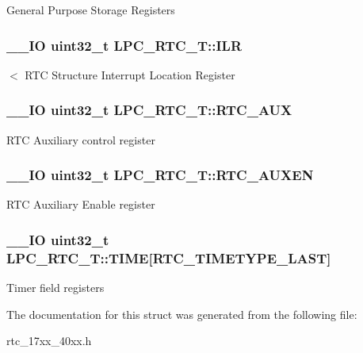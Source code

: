 General Purpose Storage Registers \hypertarget{struct_l_p_c___r_t_c___t_a6e1debaa7074a0fae4767a70f9abff29}{
\subsubsection[{I\+L\+R}]{\setlength{\rightskip}{0pt plus 5cm}\+\_\+\+\_\+\+I\+O uint32\+\_\+t L\+P\+C\+\_\+\+R\+T\+C\+\_\+\+T\+::\+I\+L\+R}}\label{struct_l_p_c___r_t_c___t_a6e1debaa7074a0fae4767a70f9abff29}
$<$ R\+T\+C Structure Interrupt Location Register \hypertarget{struct_l_p_c___r_t_c___t_ab476d508c9ea87e71724c30d36ece294}{
\subsubsection[{R\+T\+C\+\_\+\+A\+U\+X}]{\setlength{\rightskip}{0pt plus 5cm}\+\_\+\+\_\+\+I\+O uint32\+\_\+t L\+P\+C\+\_\+\+R\+T\+C\+\_\+\+T\+::\+R\+T\+C\+\_\+\+A\+U\+X}}\label{struct_l_p_c___r_t_c___t_ab476d508c9ea87e71724c30d36ece294}
R\+T\+C Auxiliary control register \hypertarget{struct_l_p_c___r_t_c___t_af65651a26ceb3d710ccdba8f762a649f}{
\subsubsection[{R\+T\+C\+\_\+\+A\+U\+X\+E\+N}]{\setlength{\rightskip}{0pt plus 5cm}\+\_\+\+\_\+\+I\+O uint32\+\_\+t L\+P\+C\+\_\+\+R\+T\+C\+\_\+\+T\+::\+R\+T\+C\+\_\+\+A\+U\+X\+E\+N}}\label{struct_l_p_c___r_t_c___t_af65651a26ceb3d710ccdba8f762a649f}
R\+T\+C Auxiliary Enable register \hypertarget{struct_l_p_c___r_t_c___t_adb4fbf67e8231188ed424c3ce226919e}{
\subsubsection[{T\+I\+M\+E}]{\setlength{\rightskip}{0pt plus 5cm}\+\_\+\+\_\+\+I\+O uint32\+\_\+t L\+P\+C\+\_\+\+R\+T\+C\+\_\+\+T\+::\+T\+I\+M\+E\mbox{[}R\+T\+C\+\_\+\+T\+I\+M\+E\+T\+Y\+P\+E\+\_\+\+L\+A\+S\+T\mbox{]}}}\label{struct_l_p_c___r_t_c___t_adb4fbf67e8231188ed424c3ce226919e}
Timer field registers 

The documentation for this struct was generated from the following file\+:\begin{DoxyCompactItemize}
\item 
rtc\+\_\+17xx\+\_\+40xx.\+h\end{DoxyCompactItemize}
